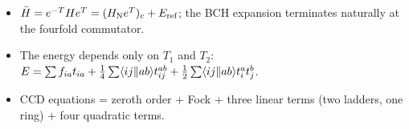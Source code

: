 \begin{summary}
\begin{itemize}
\item $\bar{H} = e^{-T} H e^T = (H_{\mathrm{N}}  e^T)_c + E_{\text{ref}}$; the BCH expansion terminates naturally at the fourfold commutator.
\item The energy depends only on $T_1$ and $T_2$: $E = \sum f_{ia} t_{ia} + \frac{1}{4} \sum \langle ij\Vert ab\rangle t_{ij}^{ab} + \frac{1}{2} \sum \langle ij\Vert ab\rangle t_i^a t_j^b$.
\item CCD equations = zeroth order + Fock + three linear terms (two ladders, one ring) + four quadratic terms.
\end{itemize}
\end{summary}
